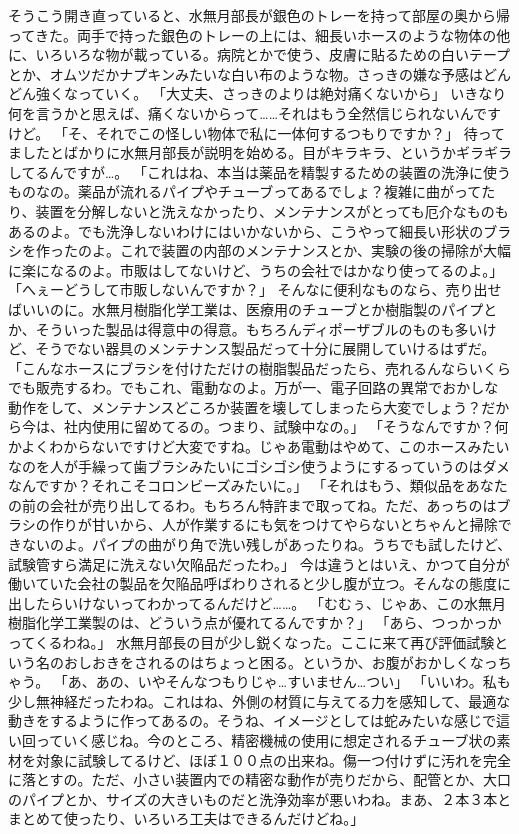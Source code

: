 そうこう開き直っていると、水無月部長が銀色のトレーを持って部屋の奥から帰ってきた。両手で持った銀色のトレーの上には、細長いホースのような物体の他に、いろいろな物が載っている。病院とかで使う、皮膚に貼るための白いテープとか、オムツだかナプキンみたいな白い布のような物。さっきの嫌な予感はどんどん強くなっていく。
「大丈夫、さっきのよりは絶対痛くないから」
いきなり何を言うかと思えば、痛くないからって……それはもう全然信じられないんですけど。
「そ、それでこの怪しい物体で私に一体何するつもりですか？」
待ってましたとばかりに水無月部長が説明を始める。目がキラキラ、というかギラギラしてるんですが…。
「これはね、本当は薬品を精製するための装置の洗浄に使うものなの。薬品が流れるパイプやチューブってあるでしょ？複雑に曲がってたり、装置を分解しないと洗えなかったり、メンテナンスがとっても厄介なものもあるのよ。でも洗浄しないわけにはいかないから、こうやって細長い形状のブラシを作ったのよ。これで装置の内部のメンテナンスとか、実験の後の掃除が大幅に楽になるのよ。市販はしてないけど、うちの会社ではかなり使ってるのよ。」
「へぇーどうして市販しないんですか？」
そんなに便利なものなら、売り出せばいいのに。水無月樹脂化学工業は、医療用のチューブとか樹脂製のパイプとか、そういった製品は得意中の得意。もちろんディポーザブルのものも多いけど、そうでない器具のメンテナンス製品だって十分に展開していけるはずだ。
「こんなホースにブラシを付けただけの樹脂製品だったら、売れるんならいくらでも販売するわ。でもこれ、電動なのよ。万が一、電子回路の異常でおかしな動作をして、メンテナンスどころか装置を壊してしまったら大変でしょう？だから今は、社内使用に留めてるの。つまり、試験中なの。」
「そうなんですか？何かよくわからないですけど大変ですね。じゃあ電動はやめて、このホースみたいなのを人が手繰って歯ブラシみたいにゴシゴシ使うようにするっていうのはダメなんですか？それこそコロンビーズみたいに。」
「それはもう、類似品をあなたの前の会社が売り出してるわ。もちろん特許まで取ってね。ただ、あっちのはブラシの作りが甘いから、人が作業するにも気をつけてやらないとちゃんと掃除できないのよ。パイプの曲がり角で洗い残しがあったりね。うちでも試したけど、試験管すら満足に洗えない欠陥品だったわ。」
今は違うとはいえ、かつて自分が働いていた会社の製品を欠陥品呼ばわりされると少し腹が立つ。そんなの態度に出したらいけないってわかってるんだけど……。
「むむぅ、じゃあ、この水無月樹脂化学工業製のは、どういう点が優れてるんですか？」
「あら、つっかっかってくるわね。」
水無月部長の目が少し鋭くなった。ここに来て再び評価試験という名のおしおきをされるのはちょっと困る。というか、お腹がおかしくなっちゃう。
「あ、あの、いやそんなつもりじゃ…すいません…つい」
「いいわ。私も少し無神経だったわね。これはね、外側の材質に与えてる力を感知して、最適な動きをするように作ってあるの。そうね、イメージとしては蛇みたいな感じで這い回っていく感じね。今のところ、精密機械の使用に想定されるチューブ状の素材を対象に試験してるけど、ほぼ１００点の出来ね。傷一つ付けずに汚れを完全に落とすの。ただ、小さい装置内での精密な動作が売りだから、配管とか、大口のパイプとか、サイズの大きいものだと洗浄効率が悪いわね。まあ、２本３本とまとめて使ったり、いろいろ工夫はできるんだけどね。」
